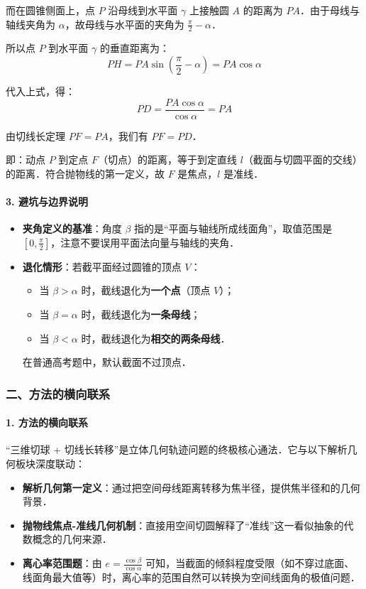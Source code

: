 \documentclass[11pt,a4paper]{ctexart}
\begin{document}
\begin{enumerate}[label=\alph*., leftmargin=2em, itemsep=1.5em, topsep=0.5em]
  而在圆锥侧面上，点 $P$ 沿母线到水平面 $\gamma$ 上接触圆 $A$ 的距离为 $PA$．由于母线与轴线夹角为 $\alpha$，故母线与水平面的夹角为 $\frac{\pi}{2} - \alpha$．
  
  所以点 $P$ 到水平面 $\gamma$ 的垂直距离为：
  \[ PH = PA \sin(\frac{\pi}{2} - \alpha) = PA \cos\alpha \]
  
  代入上式，得：
  \[ PD = \frac{PA \cos\alpha}{\cos\alpha} = PA \]
  
  由切线长定理 $PF = PA$，我们有 $PF = PD$．
  
  即：动点 $P$ 到定点 $F$（切点）的距离，等于到定直线 $l$（截面与切圆平面的交线）的距离．符合抛物线的第一定义，故 $F$ 是焦点，$l$ 是准线．
\end{enumerate}

\paragraph*{3. 避坑与边界说明}
\begin{itemize}[itemsep=0.3em]
  \item \textbf{夹角定义的基准}：角度 $\beta$ 指的是“平面与轴线所成线面角”，取值范围是 $[0, \frac{\pi}{2}]$，注意不要误用平面法向量与轴线的夹角．
  \item \textbf{退化情形}：若截平面经过圆锥的顶点 $V$：
    \begin{itemize}[itemsep=0.15em]
      \item 当 $\beta > \alpha$ 时，截线退化为\textbf{一个点}（顶点 $V$）；
      \item 当 $\beta = \alpha$ 时，截线退化为\textbf{一条母线}；
      \item 当 $\beta < \alpha$ 时，截线退化为\textbf{相交的两条母线}．
    \end{itemize}
    在普通高考题中，默认截面不过顶点．
\end{itemize}

\subsubsection*{二、方法的横向联系}

\paragraph*{1. 方法的横向联系}
“三维切球 + 切线长转移”是立体几何轨迹问题的终极核心通法．它与以下解析几何板块深度联动：
\begin{itemize}[itemsep=0.2em]
  \item \textbf{解析几何第一定义}：通过把空间母线距离转移为焦半径，提供焦半径和的几何背景．
  \item \textbf{抛物线焦点-准线几何机制}：直接用空间切圆解释了“准线”这一看似抽象的代数概念的几何来源．
  \item \textbf{离心率范围题}：由 $e = \frac{\cos\beta}{\cos\alpha}$ 可知，当截面的倾斜程度受限（如不穿过底面、线面角最大值等）时，离心率的范围自然可以转换为空间线面角的极值问题．
\end{itemize}
\end{document}
